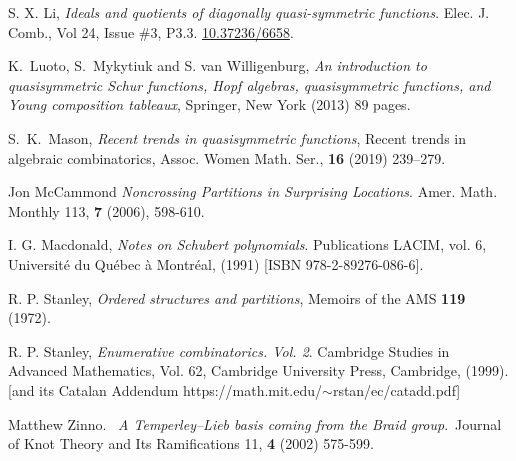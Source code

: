 \documentclass[12pt]{amsart}
\theoremstyle{definition}
\theoremstyle{remark}
\numberwithin{equation}{section}
\begin{document}
\begin{thebibliography}{99}
 S. X. Li,
\textit{Ideals and quotients of diagonally quasi-symmetric functions}.
Elec. J. Comb., Vol 24, Issue \#3, P3.3.
\href{https://doi.org/10.37236/6658}{10.37236/6658}.

K.~Luoto, S.~Mykytiuk and S. van Willigenburg,
\textit{An introduction to quasisymmetric {S}chur functions, Hopf algebras, quasisymmetric functions, and Young composition
              tableaux},
{Springer, New York}
(2013)
89 pages.
  
 S.~K.~Mason, 
\textit{Recent trends in quasisymmetric functions},
{Recent trends in algebraic combinatorics},
 {Assoc. Women Math. Ser.},
 {\bf 16} (2019) 
{239--279}.
    
 Jon McCammond
\textit{Noncrossing Partitions in Surprising Locations}.
Amer. Math. Monthly 113, {\bf 7} (2006), 598-610.

 I. G. Macdonald,
\textit{Notes on Schubert polynomials}.
Publications LACIM, vol. 6, Universit\'e du Qu\'ebec \`a Montr\'eal,  (1991) [ISBN 978-2-89276-086-6].

  R. P. Stanley, 
\textit{Ordered structures and partitions},
Memoirs of the AMS {\bf 119} (1972).

 R. P.  Stanley,
\textit{Enumerative combinatorics. {V}ol. 2}.
{Cambridge Studies in Advanced Mathematics}, Vol. {62},
{Cambridge University Press, Cambridge}, (1999). [and its {Catalan Addendum} https://math.mit.edu/$\sim$rstan/ec/catadd.pdf]

  Matthew Zinno.  \textit{A Temperley--Lieb basis coming from the Braid group}. Journal of Knot Theory and Its Ramifications 11, {\bf 4} (2002) 575-599.

\end{thebibliography}
\end{document}
